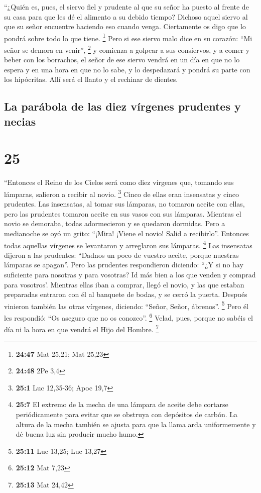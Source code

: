  ``¿Quién es, pues, el siervo fiel y prudente al que su
señor ha puesto al frente de su casa para que les dé el alimento a su
debido tiempo?  Dichoso aquel siervo al que su señor
encuentre haciendo eso cuando venga.  Ciertamente os digo
que lo pondrá sobre todo lo que tiene. \footnote{\textbf{24:47} Mat
  25,21; Mat 25,23}  Pero si ese siervo malo dice en su
corazón: ``Mi señor se demora en venir'', \footnote{\textbf{24:48} 2Pe
  3,4}  y comienza a golpear a sus consiervos, y a comer
y beber con los borrachos,  el señor de ese siervo vendrá
en un día en que no lo espera y en una hora en que no lo sabe,
 y lo despedazará y pondrá su parte con los hipócritas.
Allí será el llanto y el rechinar de dientes.

\hypertarget{la-paruxe1bola-de-las-diez-vuxedrgenes-prudentes-y-necias}{%
\subsection{La parábola de las diez vírgenes prudentes y
necias}\label{la-paruxe1bola-de-las-diez-vuxedrgenes-prudentes-y-necias}}

\hypertarget{section-24}{%
\section{25}\label{section-24}}

 ``Entonces el Reino de los Cielos será como diez vírgenes
que, tomando sus lámparas, salieron a recibir al novio. \footnote{\textbf{25:1}
  Luc 12,35-36; Apoc 19,7}  Cinco de ellas eran insensatas
y cinco prudentes.  Las insensatas, al tomar sus lámparas,
no tomaron aceite con ellas,  pero las prudentes tomaron
aceite en sus vasos con sus lámparas.  Mientras el novio
se demoraba, todas adormecieron y se quedaron dormidas. 
Pero a medianoche se oyó un grito: ``¡Mira! ¡Viene el novio! Salid a
recibirlo''.  Entonces todas aquellas vírgenes se
levantaron y arreglaron sus lámparas. \footnote{\textbf{25:7} El extremo
  de la mecha de una lámpara de aceite debe cortarse periódicamente para
  evitar que se obstruya con depósitos de carbón. La altura de la mecha
  también se ajusta para que la llama arda uniformemente y dé buena luz
  sin producir mucho humo.}  Las insensatas dijeron a las
prudentes: ``Dadnos un poco de vuestro aceite, porque nuestras lámparas
se apagan''.  Pero las prudentes respondieron diciendo:
``¿Y si no hay suficiente para nosotras y para vosotras? Id más bien a
los que venden y comprad para vosotros'.  Mientras ellas
iban a comprar, llegó el novio, y las que estaban preparadas entraron
con él al banquete de bodas, y se cerró la puerta. 
Después vinieron también las otras vírgenes, diciendo: ``Señor, Señor,
ábrenos''. \footnote{\textbf{25:11} Luc 13,25; Luc 13,27}
 Pero él les respondió: ``Os aseguro que no os conozco''.
\footnote{\textbf{25:12} Mat 7,23}  Velad, pues, porque
no sabéis el día ni la hora en que vendrá el Hijo del Hombre.
\footnote{\textbf{25:13} Mat 24,42}

